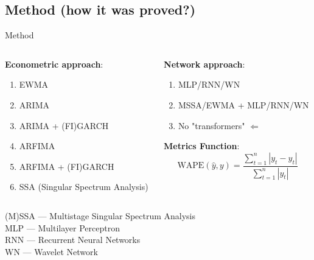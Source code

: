 \documentclass[11pt, aspectratio= 169]{beamer}
\begin{document}
	
	\subsection{Method (how it was proved?)}
	\begin{frame}{Method}
		\begin{columns}
			\begin{column}{0.5\textwidth}
				\textbf{Econometric approach}:
				\begin{center}
					\begin{enumerate}
						\item EWMA
						\item ARIMA
						\item ARIMA + (FI)GARCH
						\item ARFIMA
						\item ARFIMA + (FI)GARCH
						\item SSA (Singular Spectrum Analysis)
					\end{enumerate}
				\end{center}
			\end{column}
			\hfill
			\begin{column}{0.5\textwidth}
				\textbf{Network approach}:
				\begin{center}
					\begin{enumerate}
						\item MLP/RNN/WN
						\item MSSA/EWMA + MLP/RNN/WN
						\item No "transformers" $\Leftarrow$ \cite{zeng2022transformers}
					\end{enumerate}
				\end{center}
				\textbf{Metrics Function}:
				\begin{equation}
					\text{WAPE}(\hat{y}, y) = \frac{\sum_{t= 1}^n |y_t - \hat{y}_t|}{\sum_{t= 1}^n |y_t|}
				\end{equation}
			\end{column}
		\end{columns}
		\vspace{1cm}
		(M)SSA --- Multistage Singular Spectrum Analysis \cite{kuang2020efficient}\\
		MLP --- Multilayer Perceptron \cite{rosenblatt1961principles}\\
		RNN --- Recurrent Neural Networks \cite{hochreiter1997long}\\
		WN --- Wavelet Network \cite{alexandridis2014wavelet}
	\end{frame}
	
\end{document}

